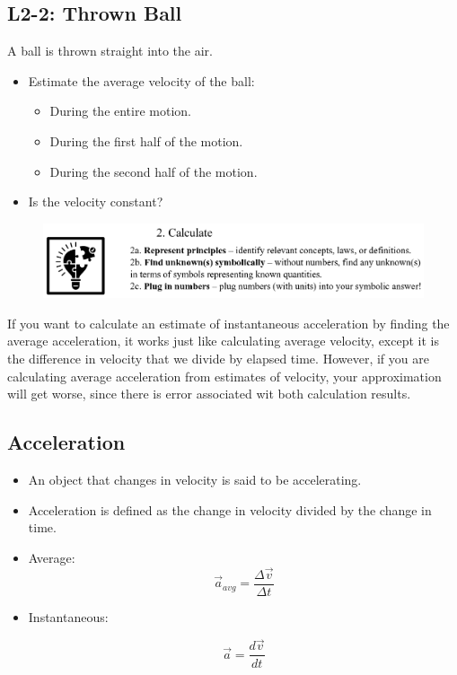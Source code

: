 \documentclass[]{article}
\begin{document}
\begin{PresentSpace}
	\vspace{-0.5cm}
	\section*{L2-2: Thrown Ball}
	\vspace{-0.2cm}
	A ball is thrown straight into the air.
	\begin{itemize}
		\item Estimate the average velocity of the ball:
		\begin{itemize}
			\item During the entire motion.
			\item During the first half of the motion.
			\item During the second half of the motion.
		\end{itemize}
		\item Is the velocity constant?
	\end{itemize}
	\vspace{11cm}
	\begin{figure}[h]
		\centering
		\includegraphics[scale=0.4]{Calculate.png}
	\end{figure}
\end{PresentSpace}
\newpage
\begin{TeacherMargin}
If you want to calculate an estimate of instantaneous acceleration by finding the average acceleration, it works just like calculating average velocity, except it is the difference in velocity that we divide by elapsed time. However, if you are calculating average acceleration from estimates of velocity, your approximation will get worse, since there is error associated wit both calculation results.
\end{TeacherMargin}
\begin{PresentSpace}
\vspace{-0.5cm}
\section*{Acceleration}
\vspace{-0.2cm}
\begin{itemize}
	\item An object that changes in velocity is said to be accelerating.
	\item Acceleration is defined as the change in velocity divided by the change in time.
	\item Average:
	\[
	\vec{a}_{avg} = \frac{\Delta\vec{v}}{\Delta t}
	\]
	\item Instantaneous:
	
	\[
	\vec{a} = \frac{d\vec{v}}{dt}
	\]
\end{itemize}
\end{PresentSpace}
\end{document}
